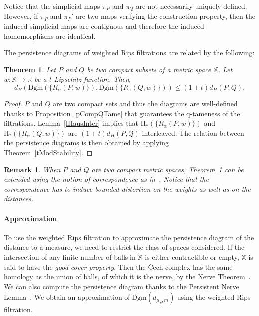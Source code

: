 \documentclass[a4paper]{article}
\newcommand\dmP{d_{\mu_P,m}}
\newcommand\X{\mathbb{X}}
\newcommand\R{\mathbb{R}}
\newcommand\Dgm[1]{\mathrm{Dgm}(#1)}
\newtheorem{theorem}{Theorem}[section]
\newtheorem{remark}{Remark}
\newcommand{\Hom}{\mathrm{H_*}}
\begin{document}
Notice that the simplicial maps $\pi_P$ and $\pi_Q$ are not necessarily uniquely defined.
However, if $\pi_P$ and $\pi_P'$ are two maps verifying the construction property, then the induced simplicial maps are contiguous and therefore the induced homomorphisms are identical.

The persistence diagrams of weighted Rips filtrations are related by the following:

\begin{theorem}\label{tPQsamespace}
Let $P$ and $Q$ be two compact subsets of a metric space $\X$.
Let $w:\X\to\R$ be a $t$-Lipschitz function.
Then,
\[
  d_B(\Dgm{\{R_\alpha(P,w)\}},\Dgm{\{R_\alpha(Q,w)\}})\leq(1+t)d_H(P,Q).
\]
\end{theorem}

\begin{proof}
$P$ and $Q$ are two compact sets and thus the diagrams are well-defined thanks to Proposition~\ref{pCompQTame} that guarantees the q-tameness of the filtrations. 
Lemma~\ref{lHausInter} implies that $\Hom(\{R_\alpha(P,w)\})$ and $\Hom(\{R_\alpha(Q,w)\})$ are $(1+t)d_H(P,Q)$-interleaved.
The relation between the persistence diagrams is then obtained by applying Theorem~\ref{tModStability}.
\end{proof}

\begin{remark}
When $P$ and $Q$ are two compact metric spaces, Theorem~\ref{tPQsamespace} can be extended using the notion of correspondence as in~\cite{psgcCDO}.
Notice that the correspondence has to induce bounded distortion on the weights as well as on the distances.
\end{remark}

\paragraph{Approximation\\}
To use the weighted Rips filtration to approximate the persistence diagram of the distance to a measure, we need to restrict the class of spaces considered.
If the intersection of any finite number of balls in $\X$ is either contractible or empty, $\X$ is said to have the \emph{good cover property}.
Then the \v{C}ech complex has the same homology as the union of balls, of which it is the nerve, by the Nerve Theorem~\cite{atH}.
We can also compute the persistence diagram thanks to the Persistent Nerve Lemma~\cite{tpbresCO}.
We obtain an approximation of $\Dgm{\dmP}$ using the weighted Rips filtration.
\end{document}

